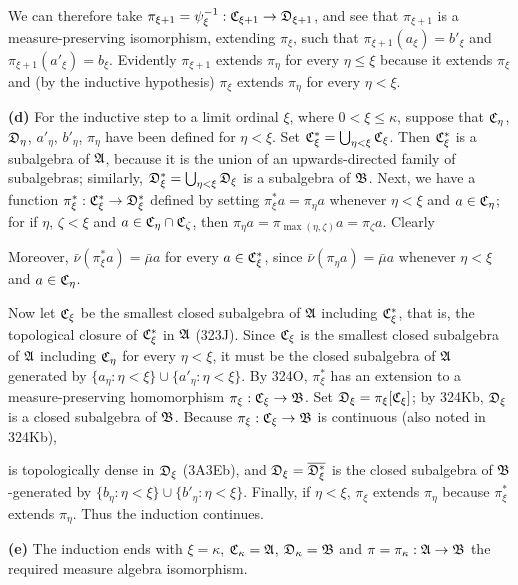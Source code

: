 {\medskip

 We can therefore take $\pi_{\xi+1}
=\psi_{\xi}^{-1}:\frak C_{\xi+1}\to\frak D_{\xi+1}$, and see that
$\pi_{\xi+1}$ is a measure-preserving isomorphism, extending
$\pi_{\xi}$, such that $\pi_{\xi+1}(a_{\xi})=b'_{\xi}$ and
$\pi_{\xi+1}(a'_{\xi})=b_{\xi}$.   Evidently $\pi_{\xi+1}$ extends
$\pi_{\eta}$ for every $\eta\le\xi$ because it extends $\pi_{\xi}$ and
(by the inductive hypothesis) $\pi_{\xi}$ extends $\pi_{\eta}$ for every
$\eta<\xi$.

\medskip

{\bf (d)} For the inductive step to a limit ordinal $\xi$, where
$0<\xi\le\kappa$, suppose that $\frak C_{\eta}$, $\frak D_{\eta}$,
$a'_{\eta}$, $b'_{\eta}$, $\pi_{\eta}$ have been defined for $\eta<\xi$.
Set $\frak C^*_{\xi}=\bigcup_{\eta<\xi}\frak C_{\xi}$.   Then $\frak
C^*_{\xi}$ is a subalgebra of $\frak A$, because it is the union of an
upwards-directed family of subalgebras;  similarly, $\frak
D^*_{\xi}=\bigcup_{\eta<\xi}\frak D_{\xi}$ is a subalgebra of $\frak B$.
Next, we have a function $\pi^*_{\xi}:\frak C^*_{\xi}\to\frak D^*_{\xi}$
defined by setting $\pi^*_{\xi}a=\pi_{\eta}a$ whenever $\eta<\xi$ and
$a\in\frak C_{\eta}$;  for if $\eta$, $\zeta<\xi$ and $a\in\frak
C_{\eta}\cap\frak C_{\zeta}$, then
$\pi_{\eta}a=\pi_{\max(\eta,\zeta)}a=\pi_{\zeta}a$.   Clearly


\noindent Moreover, $\bar\nu(\pi^*_{\xi}a)=\bar\mu a$ for every $a\in\frak C^*_{\xi}$,
since $\bar\nu(\pi_{\eta}a)=\bar\mu a$ whenever $\eta<\xi$ and
$a\in\frak C_{\eta}$.

Now let $\frak C_{\xi}$ be the smallest closed subalgebra of
$\frak A$ including $\frak C^*_{\xi}$, that is, the topological closure of
$\frak C^*_{\xi}$ in $\frak A$ (323J).   Since $\frak C_{\xi}$ is the
smallest closed subalgebra of $\frak A$ including $\frak C_{\eta}$ for every
$\eta<\xi$, it must be the closed subalgebra of $\frak A$ generated by
$\{a_{\eta}:\eta<\xi\}\cup\{a'_{\eta}:\eta<\xi\}$.
By 324O, $\pi^*_{\xi}$ has an extension to a measure-preserving
homomorphism $\pi_{\xi}:\frak C_{\xi}\to\frak B$.   Set
$\frak D_{\xi}=\pi_{\xi}[\frak C_{\xi}]$;  by 324Kb, $\frak D_{\xi}$ is a
closed subalgebra of $\frak B$.   Because
$\pi_{\xi}:\frak C_{\xi}\to\frak B$ is continuous (also noted in 324Kb),


\noindent is topologically dense in $\frak D_{\xi}$ (3A3Eb), and
$\frak D_{\xi}=\overline{\frak D^*_{\xi}}$ is the closed subalgebra of
$\frak B$-generated by
$\{b_{\eta}:\eta<\xi\}\cup\{b'_{\eta}:\eta<\xi\}$.   Finally, if
$\eta<\xi$, $\pi_{\xi}$ extends $\pi_{\eta}$ because $\pi^*_{\xi}$
extends $\pi_{\eta}$.   Thus the induction continues.

\medskip

{\bf (e)} The induction ends with $\xi=\kappa$, $\frak C_{\kappa}=\frak A$,
$\frak D_{\kappa}=\frak B$ and $\pi=\pi_{\kappa}:\frak A\to\frak B$
the required measure algebra isomorphism.
}%

